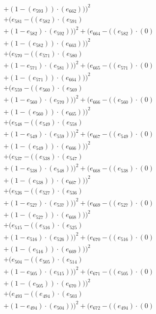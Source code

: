 \documentclass[10pt, a4paper]{article}
\begin{document}
\begin{align*}
& + (1 - (e_{593})) \cdot (e_{662})))^{2} \\
& + (e_{581} - ((e_{582})  \cdot  (e_{591}) \\
& + (1 - e_{582})  \cdot  (e_{592})))^{2} + (e_{664} - ((e_{582}) \cdot (0) \\
& + (1 - (e_{582})) \cdot (e_{663})))^{2} \\
& + (e_{570} - ((e_{571})  \cdot  (e_{580}) \\
& + (1 - e_{571})  \cdot  (e_{581})))^{2} + (e_{665} - ((e_{571}) \cdot (0) \\
& + (1 - (e_{571})) \cdot (e_{664})))^{2} \\
& + (e_{559} - ((e_{560})  \cdot  (e_{569}) \\
& + (1 - e_{560})  \cdot  (e_{570})))^{2} + (e_{666} - ((e_{560}) \cdot (0) \\
& + (1 - (e_{560})) \cdot (e_{665})))^{2} \\
& + (e_{548} - ((e_{549})  \cdot  (e_{558}) \\
& + (1 - e_{549})  \cdot  (e_{559})))^{2} + (e_{667} - ((e_{549}) \cdot (0) \\
& + (1 - (e_{549})) \cdot (e_{666})))^{2} \\
& + (e_{537} - ((e_{538})  \cdot  (e_{547}) \\
& + (1 - e_{538})  \cdot  (e_{548})))^{2} + (e_{668} - ((e_{538}) \cdot (0) \\
& + (1 - (e_{538})) \cdot (e_{667})))^{2} \\
& + (e_{526} - ((e_{527})  \cdot  (e_{536}) \\
& + (1 - e_{527})  \cdot  (e_{537})))^{2} + (e_{669} - ((e_{527}) \cdot (0) \\
& + (1 - (e_{527})) \cdot (e_{668})))^{2} \\
& + (e_{515} - ((e_{516})  \cdot  (e_{525}) \\
& + (1 - e_{516})  \cdot  (e_{526})))^{2} + (e_{670} - ((e_{516}) \cdot (0) \\
& + (1 - (e_{516})) \cdot (e_{669})))^{2} \\
& + (e_{504} - ((e_{505})  \cdot  (e_{514}) \\
& + (1 - e_{505})  \cdot  (e_{515})))^{2} + (e_{671} - ((e_{505}) \cdot (0) \\
& + (1 - (e_{505})) \cdot (e_{670})))^{2} \\
& + (e_{493} - ((e_{494})  \cdot  (e_{503}) \\
& + (1 - e_{494})  \cdot  (e_{504})))^{2} + (e_{672} - ((e_{494}) \cdot (0) \\

\end{align*}
\end{document}
